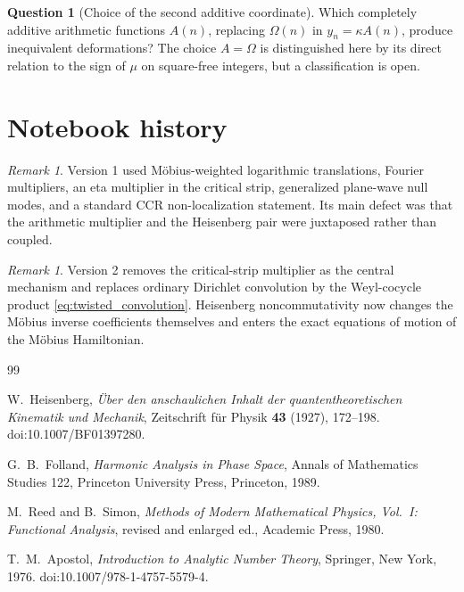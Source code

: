 \documentclass[11pt]{amsart}
\numberwithin{equation}{section}
\theoremstyle{plain}
\theoremstyle{definition}
\newtheorem{question}[theorem]{Question}
\theoremstyle{remark}
\newtheorem{remark}[theorem]{Remark}
\newcommand{\Om}{\Omega}
\begin{document}
\begin{question}[Choice of the second additive coordinate]
\label{q:additive_coordinate}
Which completely additive arithmetic functions $A(n)$, replacing $\Om(n)$
in $y_n=\kappa A(n)$, produce inequivalent deformations?  The choice
$A=\Om$ is distinguished here by its direct relation to the sign of $\mu$ on
square-free integers, but a classification is open.
\end{question}

\section{Notebook history}
\label{sec:notebook_history}

\begin{remark}
\label{rem:history_v1}
Version 1 used M\"obius-weighted logarithmic translations, Fourier
multipliers, an eta multiplier in the critical strip, generalized plane-wave
null modes, and a standard CCR non-localization statement.  Its main defect
was that the arithmetic multiplier and the Heisenberg pair were juxtaposed
rather than coupled.
\end{remark}

\begin{remark}
\label{rem:history_v2}
Version 2 removes the critical-strip multiplier as the central mechanism and
replaces ordinary Dirichlet convolution by the Weyl-cocycle product
\eqref{eq:twisted_convolution}.  Heisenberg noncommutativity now changes the
M\"obius inverse coefficients themselves and enters the exact equations of
motion of the M\"obius Hamiltonian.
\end{remark}

\begin{thebibliography}{99}

W.~Heisenberg,
\emph{\"Uber den anschaulichen Inhalt der quantentheoretischen Kinematik und
Mechanik},
Zeitschrift f\"ur Physik \textbf{43} (1927), 172--198.
doi:10.1007/BF01397280.

G.~B.~Folland,
\emph{Harmonic Analysis in Phase Space},
Annals of Mathematics Studies 122,
Princeton University Press, Princeton, 1989.

M.~Reed and B.~Simon,
\emph{Methods of Modern Mathematical Physics, Vol.~I: Functional Analysis},
revised and enlarged ed., Academic Press, 1980.

T.~M.~Apostol,
\emph{Introduction to Analytic Number Theory},
Springer, New York, 1976.
doi:10.1007/978-1-4757-5579-4.

\end{thebibliography}
\end{document}
